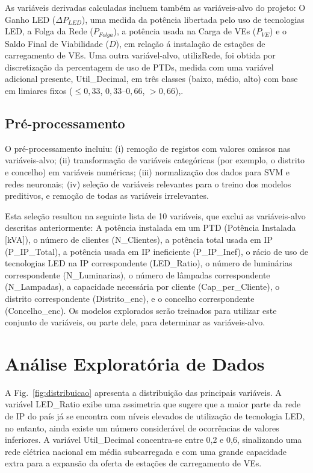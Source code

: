 \documentclass[conference]{IEEEtran}
\begin{document}
As variáveis derivadas calculadas incluem também as variáveis-alvo do projeto: O Ganho LED ($\Delta P_{LED}$), uma medida da potência libertada pelo uso de tecnologias LED, a Folga da Rede ($P_{Folga}$), a potência usada na Carga de VEs ($P_{VE}$) e o Saldo Final de Viabilidade ($D$), em relação á instalação de estações de carregamento de VEs. Uma outra variável-alvo, utilizRede, foi obtida por discretização da percentagem de uso de PTDs, medida com uma variável adicional presente, Util\_Decimal, em três classes (baixo, médio, alto) com base em limiares fixos ($\leq 0{,}33$, $0{,}33$--$0{,}66$, $> 0{,}66$),.

\subsection{Pré-processamento}

O pré-processamento incluiu: (i) remoção de registos com valores omissos nas variáveis-alvo; (ii) transformação de variáveis categóricas (por exemplo, o distrito e concelho) em variáveis numéricas; (iii) normalização dos dados para SVM e redes neuronais; (iv) seleção de variáveis relevantes para o treino dos modelos preditivos, e remoção de todas as variáveis irrelevantes.

Esta seleção resultou na seguinte lista de 10 variáveis, que exclui as variáveis-alvo descritas anteriormente: A potência instalada em um PTD (Potência Instalada [kVA]), o número de clientes (N\_Clientes), a potência total usada em IP (P\_IP\_Total), a potência usada em IP ineficiente (P\_IP\_Inef), o rácio de uso de tecnologias LED na IP correspondente (LED\_Ratio), o número de luminárias correspondente (N\_Luminarias), o número de lâmpadas correspondente (N\_Lampadas), a capacidade necessária por cliente (Cap\_per\_Cliente), o distrito correspondente (Distrito\_enc), e o concelho correspondente (Concelho\_enc). Os modelos explorados serão treinados para utilizar este conjunto de variáveis, ou parte dele, para determinar as variáveis-alvo.

\section{Análise Exploratória de Dados}

A Fig.~\ref{fig:distribuicao} apresenta a distribuição das principais variáveis. A variável LED\_Ratio exibe uma assimetria que sugere que a maior parte da rede de IP do país já se encontra com níveis elevados de utilização de tecnologia LED, no entanto, ainda existe um número considerável de ocorrências de valores inferiores. A variável Util\_Decimal concentra-se entre 0,2 e 0,6, sinalizando uma rede elétrica nacional em média subcarregada e com uma grande capacidade extra para a expansão da oferta de estações de carregamento de VEs.
\end{document}
